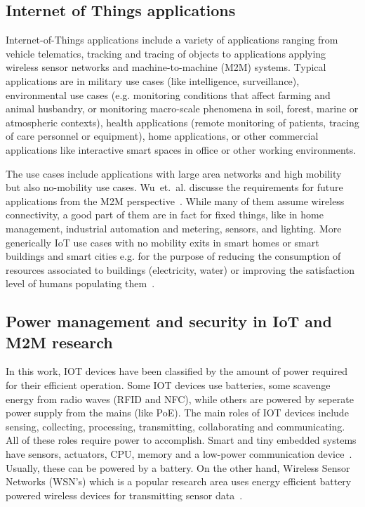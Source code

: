\documentclass[draft,a4paper]{siamltex}
\begin{document}
\subsection{Internet of Things applications}

Internet-of-Things applications include a variety of applications
ranging from vehicle telematics, tracking and tracing of objects to
applications applying wireless sensor networks and machine-to-machine
(M2M) systems. Typical applications are in military use cases (like
intelligence, surveillance), environmental use cases (e.g. monitoring
conditions that affect farming and animal husbandry, or monitoring
macro-scale phenomena in soil, forest, marine or atmospheric
contexts), health applications (remote monitoring of patients, tracing
of care personnel or equipment), home applications, or other
commercial applications like interactive smart spaces in office or
other working environments.

The use cases include applications with large area networks and high
mobility but also no-mobility use cases. Wu~et.~al. discusse the
requirements for future applications from the M2M
perspective~\cite{wu2011m2m}. While many of them assume wireless
connectivity, a good part of them are in fact for fixed things, like
in home management, industrial automation and metering, sensors, and
lighting. More generically IoT use cases with no mobility exits in
smart homes or smart buildings and smart cities e.g. for the purpose
of reducing the consumption of resources associated to buildings
(electricity, water) or improving the satisfaction level of humans
populating them~\cite{miorandi2012internet}.

\subsection{Power management and security in IoT and M2M research}

In this work, IOT devices have been classified by the amount of power required
for their efficient operation. Some IOT devices use batteries, some scavenge
energy from radio waves (RFID and NFC), while others are powered by seperate
power supply from the mains (like PoE).  The main roles of IOT devices include
sensing, collecting, processing, transmitting, collaborating and communicating.
All of these roles require power to accomplish. Smart and tiny embedded systems
have sensors, actuators, CPU, memory and a low-power communication
device~\cite{lopez2012adding}. Usually, these can be powered by a battery. On
the other hand, Wireless Sensor Networks (WSN's) which is a popular research
area uses energy efficient battery powered wireless devices for transmitting
sensor data~\cite{akyildiz2002wireless}.
\end{document}

